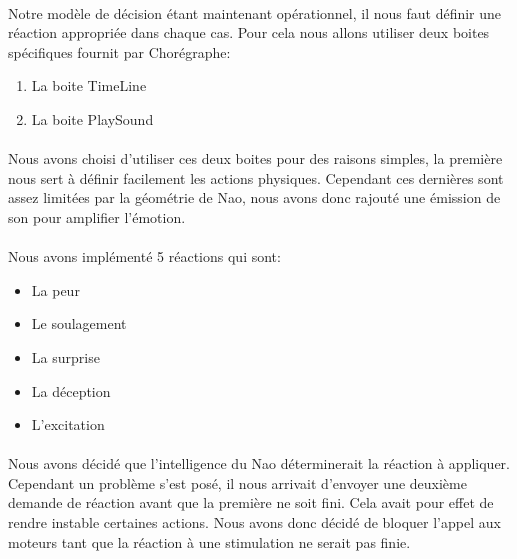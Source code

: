 \paragraph{}
Notre modèle de décision étant maintenant opérationnel, il nous faut définir une
réaction appropriée dans chaque cas. Pour cela nous allons utiliser deux boites
spécifiques fournit par Chorégraphe:\\
\begin{enumerate}
  \item La boite TimeLine
  \item La boite PlaySound
\end{enumerate}

\paragraph{}
Nous avons choisi d'utiliser ces deux boites pour des raisons simples, la
première nous sert à définir facilement les actions physiques. Cependant ces
dernières sont assez limitées par la géométrie de Nao, nous avons donc rajouté
une émission de son pour amplifier l'émotion.

\paragraph{}
Nous avons implémenté 5 réactions qui sont:\\
\begin{itemize}
  \item La peur
  \item Le soulagement
  \item La surprise
  \item La déception
  \item L'excitation
\end{itemize}


\paragraph{}
Nous avons décidé que l'intelligence du Nao déterminerait la réaction à
appliquer. Cependant un problème s'est posé, il nous arrivait d'envoyer une
deuxième demande de réaction avant que la première ne soit fini. Cela avait pour
effet de rendre instable certaines actions. Nous avons donc décidé de bloquer
l'appel aux moteurs tant que la réaction à une stimulation ne serait pas finie.

